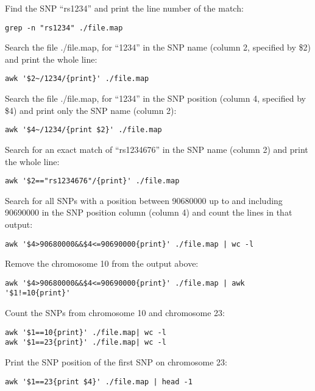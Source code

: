 \documentclass[]{book}
\begin{document}
Find the SNP ``rs1234'' and print the line number of the match:

\begin{verbatim}
grep -n "rs1234" ./file.map
\end{verbatim}

Search the file ./file.map, for ``1234'' in the SNP name (column 2,
specified by \$2) and print the whole line:

\begin{verbatim}
awk '$2~/1234/{print}' ./file.map
\end{verbatim}

Search the file ./file.map, for ``1234'' in the SNP position (column 4,
specified by \$4) and print only the SNP name (column 2):

\begin{verbatim}
awk '$4~/1234/{print $2}' ./file.map
\end{verbatim}

Search for an exact match of ``rs1234676'' in the SNP name (column 2)
and print the whole line:

\begin{verbatim}
awk '$2=="rs1234676"/{print}' ./file.map
\end{verbatim}

Search for all SNPs with a position between 90680000 up to and including
90690000 in the SNP position column (column 4) and count the lines in
that output:

\begin{verbatim}
awk '$4>90680000&&$4<=90690000{print}' ./file.map | wc -l
\end{verbatim}

Remove the chromosome 10 from the output above:

\begin{verbatim}
awk '$4>90680000&&$4<=90690000{print}' ./file.map | awk '$1!=10{print}'
\end{verbatim}

Count the SNPs from chromosome 10 and chromosome 23:

\begin{verbatim}
awk '$1==10{print}' ./file.map| wc -l
awk '$1==23{print}' ./file.map| wc -l
\end{verbatim}

Print the SNP position of the first SNP on chromosome 23:

\begin{verbatim}
awk '$1==23{print $4}' ./file.map | head -1
\end{verbatim}
\end{document}
